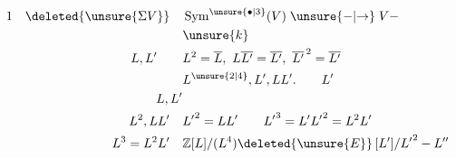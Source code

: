 \[
\begin{aligned}
1\quad\deleted{\unsure{\Sigma V}}\quad &\operatorname{Sym}^{\unsure{\bullet|3}}(V)\; \unsure{-|{\to}}\;V-\\
&\unsure{k}\\
L,L'\qquad &L^2=\overline L,\ L\overline{L'}=\overline{L'},\ \overline{L'}^{\,2}=\overline{L'}\\
& L^{\unsure{2|4}},L',LL'.\qquad L'\\
L,L'&\\
L^2,LL'\quad & {L'}^{2}=LL'\qquad {L'}^{3}=L'{L'}^{2}=L^2L'\\
L^3=L^2L'\quad &\mathbb Z[L]/(L^4)\deleted{\unsure{E}}\,[L']/{L'}^{2}-L^{\prime\prime}
\end{aligned}
\]
